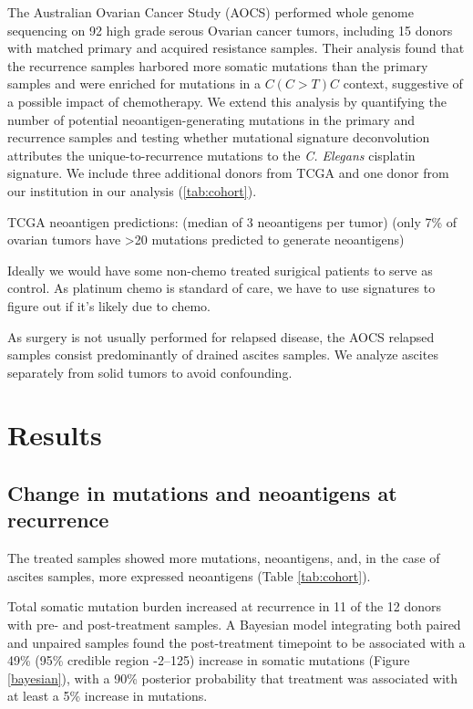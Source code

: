 The Australian Ovarian Cancer Study (AOCS)\cite{Patch_2015} performed whole genome sequencing on 92 high grade serous Ovarian cancer tumors, including 15 donors with matched primary and acquired resistance samples. Their analysis found that the recurrence samples harbored more somatic mutations than the primary samples and were enriched for mutations in a $C(C \gt T)C$ context, suggestive of a possible impact of chemotherapy. We extend this analysis by quantifying the number of potential neoantigen-generating mutations in the primary and recurrence samples and testing whether mutational signature deconvolution attributes the unique-to-recurrence mutations to the \textit{C. Elegans} cisplatin signature. We include three additional donors from TCGA and one donor from our institution in our analysis (\ref{tab:cohort}).

TCGA neoantigen predictions: \cite{Brown_2014} (median of 3 neoantigens per tumor) \cite{Rooney_2015} (only 7\% of ovarian tumors have >20 mutations predicted to generate neoantigens)

Ideally we would have some non-chemo treated surigical patients to serve as control. As platinum chemo is standard of care, we have to use signatures to figure out if it's likely due to chemo.

As surgery is not usually performed for relapsed disease, the AOCS relapsed samples consist predominantly of drained ascites samples. We analyze ascites separately from solid tumors to avoid confounding.



\section*{Results}

\subsection*{Change in mutations and neoantigens at recurrence}
The treated samples showed more mutations, neoantigens, and, in the case of ascites samples, more expressed neoantigens (Table \ref{tab:cohort}).

Total somatic mutation burden increased at recurrence in 11 of the 12 donors with pre- and post-treatment samples. A Bayesian model integrating both paired and unpaired samples found the post-treatment timepoint to be associated with a 49\% (95\% credible region -2--125) increase in somatic mutations (Figure \ref{bayesian}), with a 90\% posterior probability that treatment was associated with at least a 5\% increase in mutations. 

